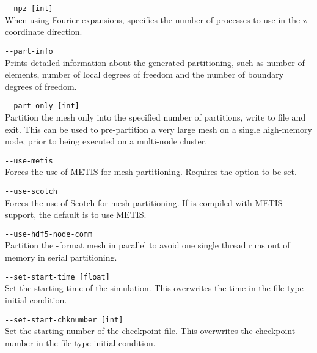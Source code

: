 \lstinline[style=BashInputStyle]{--npz [int]}\\
\hangindent=1.5cm
When using Fourier expansions, specifies the number of processes to use in the z-coordinate direction.

\lstinline[style=BashInputStyle]{--part-info}\\
\hangindent=1.5cm
Prints detailed information about the generated partitioning, such as number of
elements, number of local degrees of freedom and the number of boundary degrees
of freedom.

\lstinline[style=BashInputStyle]{--part-only [int]}\\
\hangindent=1.5cm
Partition the mesh only into the specified number of partitions, write to file
and exit. This can be used to pre-partition a very large mesh on a single
high-memory node, prior to being executed on a multi-node cluster.

\lstinline[style=BashInputStyle]{--use-metis}\\
\hangindent=1.5cm
Forces the use of METIS for mesh partitioning. Requires the
 option to be set.

\lstinline[style=BashInputStyle]{--use-scotch}\\
\hangindent=1.5cm
Forces the use of Scotch for mesh partitioning. If \nekpp{} is compiled with
METIS support, the default is to use METIS.

\lstinline[style=BashInputStyle]{--use-hdf5-node-comm}\\
\hangindent=1.5cm
Partition the -format mesh in parallel to avoid one single thread runs out of memory in serial partitioning.

\lstinline[style=BashInputStyle]{--set-start-time [float]}\\
\hangindent=1.5cm
Set the starting time of the simulation. This overwrites the time in the file-type initial condition.

\lstinline[style=BashInputStyle]{--set-start-chknumber [int]}\\
\hangindent=1.5cm
Set the starting number of the checkpoint file. This overwrites the checkpoint number in the file-type initial condition.
